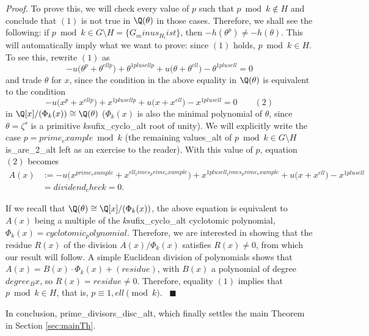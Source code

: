 \textit{Proof.} To prove this, we will check every value of $p$ such that $p \bmod{{k}}\notin H$ and conclude that $(1)$ is not true in $\Q(\theta)$ in those cases. Therefore, we shall see the following: if $p \bmod{{k}}\in G\setminus H=\{{G_minus_H_list}\}$, then $-h(\theta^p)\neq -h(\theta)$. This will automatically imply what we want to prove: since $(1)$ holds, $p \bmod{{k}}\in H$. To see this, rewrite $(1)$ as
\begin{equation}\label{eq:equalityQ}
-{u}\big(\theta^{p}+\theta^{{ell}p}\big)+\theta^{{1plusell}p}+{u}\big(\theta+\theta^{{ell}}\big)-\theta^{{1plusell}}=0
\end{equation}
and trade $\theta$ for $x$, since the condition in the above equality in $\Q(\theta)$ is equivalent to the condition
\begin{equation}\label{eq:polycheck0}
-{u}\big(x^p+x^{{ell}p}\big)+x^{{1plusell}p}+{u}\big(x+x^{{ell}}\big)-x^{{1plusell}}=0 \quad \quad (2)
\end{equation}
in $\Q[x]/(\Phi_{{k}}(x))\cong\Q(\theta)$ ($\Phi_{{k}}(x)$ is also the minimal polynomial of $\theta$, since $\theta=\zeta^{s}$ is a primitive ${k}${sufix_cyclo_alt} root of unity). We will explicitly write the case $p={prime_example} \bmod{{k}}$ (the remaining {values_alt} of $p \bmod{{k}}\in G\setminus H$ {is_are_2_alt} left as an exercise to the reader). With this value of $p$, equation $(2)$ becomes
\begin{align*}
A(x)&:=-{u}\big(x^{{prime_example}}+x^{{ell_times_prime_example}}\big)+x^{{1plusell_times_prime_example}}+{u}\big(x+x^{{ell}}\big)-x^{{1plusell}}\\
&={dividend_check}=0.
\end{align*}

If we recall that $\Q(\theta)\cong\Q[x]/(\Phi_{{k}}(x))$, the above equation is equivalent to $A(x)$ being a multiple of the ${k}${sufix_cyclo_alt} cyclotomic polynomial, $\Phi_{{k}}(x) = {cyclotomic_polynomial}$. Therefore, we are interested in showing that the residue $R(x)$ of the division $A(x)/\Phi_{{k}}(x)$ satisfies $R(x)\neq 0$, from which our result will follow. A simple Euclidean division of polynomials shows that $A(x)=B(x)\cdot\Phi_{{k}}(x)+({residue})$, with $B(x)$ a polynomial of degree ${degree_Bx}$, so $R(x)={residue} \neq 0$. Therefore, equality $(1)$ implies that $p \bmod{{k}} \in H$, that is, $p\equiv 1,{ell}\pmod{{k}}$. \ $\blacksquare$

In conclusion, {prime_divisors_disc_alt}, which finally settles the main Theorem in Section \ref{sec:mainTh}.